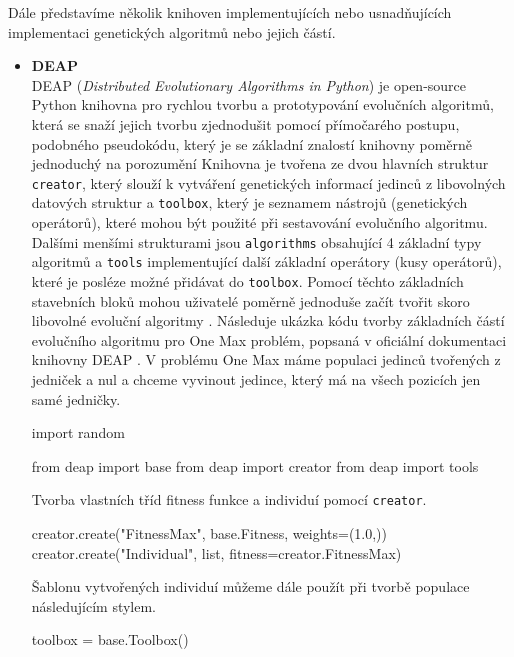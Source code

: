 Dále představíme několik knihoven implementujících nebo usnadňujících
implementaci genetických algoritmů nebo jejich částí. 

\begin{itemize}
    \item \textbf{DEAP}\\ DEAP (\emph{Distributed Evolutionary Algorithms in
        Python}) je open-source Python knihovna pro rychlou tvorbu a
        prototypování evolučních algoritmů, která se snaží jejich tvorbu
        zjednodušit pomocí přímočarého postupu, podobného pseudokódu, který je
        se základní znalostí knihovny poměrně jednoduchý na porozumění Knihovna
        je tvořena ze dvou hlavních struktur \texttt{creator}, který slouží k
        vytváření genetických informací jedinců z libovolných datových struktur
        a \texttt{toolbox}, který je seznamem nástrojů (genetických operátorů),
        které mohou být použité při sestavování evolučního algoritmu. Dalšími
        menšími strukturami jsou \texttt{algorithms} obsahující 4 základní typy
        algoritmů a \texttt{tools} implementující další základní operátory
        (kusy operátorů), které je posléze možné přidávat do \texttt{toolbox}.
        Pomocí těchto základních stavebních bloků mohou uživatelé poměrně
        jednoduše začít tvořit skoro libovolné evoluční algoritmy
        \citep{fortin2012deap}. Následuje ukázka kódu tvorby základních částí
        evolučního algoritmu pro One Max problém, popsaná v oficiální
        dokumentaci knihovny DEAP \citep{deapproject}. V problému One Max máme
        populaci jedinců tvořených z jedniček a nul a chceme vyvinout jedince,
        který má na všech pozicích jen samé jedničky.

\begin{code}
import random

from deap import base
from deap import creator
from deap import tools
\end{code}

        Tvorba vlastních tříd fitness funkce a individuí pomocí
        \texttt{creator}.
\begin{code}
creator.create("FitnessMax", base.Fitness, weights=(1.0,))
creator.create("Individual", list, fitness=creator.FitnessMax)
\end{code}

        Šablonu vytvořených individuí můžeme dále použít při tvorbě populace
        následujícím stylem.
\begin{code}
toolbox = base.Toolbox()


\end{code}
\end{itemize}

